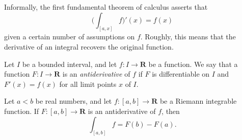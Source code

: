 \begin{note}
    Informally, the first fundamental theorem of calculus asserts that
    \[
        \bigg(\int_{[a, x]} f\bigg)'(x) = f(x)
    \]
    given a certain number of assumptions on \(f\).
    Roughly, this means that the derivative of an integral recovers the original function.
\end{note}

\setcounter{theorem}{2}
\begin{definition}[Antiderivatives]\label{11.9.3}
    Let \(I\) be a bounded interval, and let \(f : I \to \mathbf{R}\) be a function.
    We say that a function \(F : I \to \mathbf{R}\) is an \emph{antiderivative} of \(f\) if \(F\) is differentiable on \(I\) and \(F'(x) = f(x)\) for all limit points \(x\) of \(I\).
\end{definition}

\begin{theorem}\label{11.9.4}
    Let \(a < b\) be real numbers, and let \(f : [a, b] \to \mathbf{R}\) be a Riemann integrable function.
    If \(F : [a, b] \to \mathbf{R}\) is an antiderivative of \(f\), then
    \[
        \int_{[a, b]} f = F(b) - F(a).
    \]
\end{theorem}

